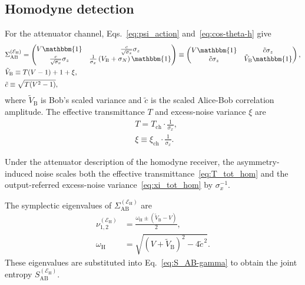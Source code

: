 \documentclass[%
final, 
superscriptaddress,
 amsmath,amssymb,amsfonts,
 aps,
 pra,
 longbibliography,
]{revtex4-2}
\newcommand{\ind}[1]{\mathrm{#1}}
\begin{document}
\subsection{Homodyne detection}
For the attenuator channel, Eqs.~\eqref{eq:psi_action} and~\eqref{eq:cos-theta-h} give
\begin{align}
    \label{eq:psi-h-action}
    &\Sigma_{\ind{AB}}^{(\mathcal{E}_{\ind{H}})}=
    \begin{pmatrix}
        V\mathbbm{1}&\frac{c}{\sqrt{\sigma_x}}\sigma_z\\
        \frac{c}{\sqrt{\sigma_x}}\sigma_z&\frac{1}{{\sigma_x}}\left(V_{\ind{B}}+\sigma_N\right)\mathbbm{1}
    \end{pmatrix}\equiv
    \begin{pmatrix}
        V\mathbbm{1}&\tilde{c}\sigma_z\\
        \tilde{c}\sigma_z&\tilde{V}_{\ind{B}}\mathbbm{1}
    \end{pmatrix},\\
    &\tilde{V}_{\ind{B}}\equiv
    {T}(V-1)+1+{\xi}
    ,\\
    &\tilde{c}\equiv\sqrt{{T}(V^2-1)},
\end{align}
where $\tilde{V}_{\ind{B}}$ is Bob's scaled variance and $\tilde{c}$ is the scaled Alice-Bob correlation amplitude. The effective transmittance $T$ and excess-noise variance $\xi$ are
\begin{subequations}
\label{eq:tot_hom}
\begin{align}
    \label{eq:T_tot_hom}
    &T=T_{\ind{ch}}\cdot \frac{1}{\sigma_x},\\
    \label{eq:xi_tot_hom}
    &\xi\equiv\xi_{\ind{ch}}\cdot\frac{1}{\sigma_x}.
\end{align}
\end{subequations}

Under the attenuator description of the homodyne receiver, the asymmetry-induced noise scales both the effective transmittance~\eqref{eq:T_tot_hom} and the output-referred excess-noise variance~\eqref{eq:xi_tot_hom} by $\sigma_x^{-1}$.

The symplectic eigenvalues of
$\Sigma_{\ind{AB}}^{(\mathcal{E}_{\ind{H}})}$
are~\cite{Weed:rmp:2012}
\begin{align}
  \label{eq:lambda12-h}
  \nu_{1,2}^{(\mathcal{E}_{\ind{H}})}
  &=
  \frac{
    \omega_{\ind{H}}
    \pm
    \left(
      \tilde{V}_{\ind{B}}-V
    \right)
  }{2},
  \\
  \omega_{\ind{H}}
  &=
  \sqrt{
    \left(
      V+\tilde{V}_{\ind{B}}
    \right)^2
    -
    4\tilde{c}^{\,2}
  }.
\end{align}
These eigenvalues are substituted into Eq.~\eqref{eq:S_AB-gamma} to obtain the joint entropy
$S_{\ind{AB}}^{(\mathcal{E}_{\ind{H}})}$.
\end{document}
